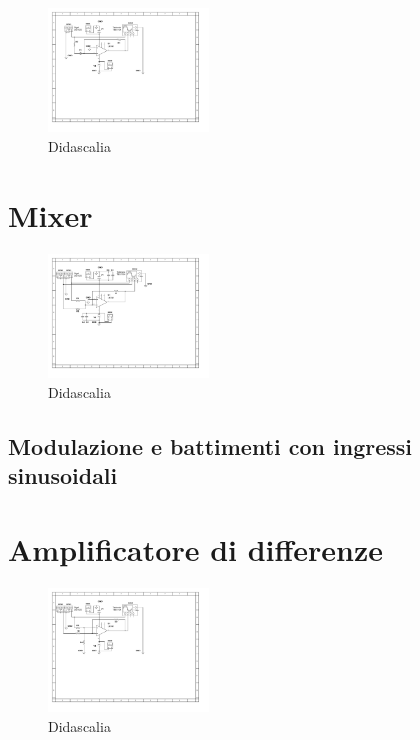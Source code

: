 \documentclass[journal]{IEEEtran}
\begin{document}
\begin{figure}[H]%
\begin {center}
\includegraphics[width=0.38\textwidth]{sch-simulations/output/OPA-deriv.pdf}
\caption{Didascalia}
\label{fig:oscilloscope}
\end {center}
\end{figure}


\section{Mixer} %

\begin{figure}[H]%
\begin {center}
\includegraphics[width=0.38\textwidth]{sch-simulations/output/OPA-mixer.pdf}
\caption{Didascalia}
\label{fig:oscilloscope}
\end {center}
\end{figure}

\subsection{Modulazione e battimenti con ingressi sinusoidali}


\section{Amplificatore di differenze} %
\begin{figure}[H]%
\begin {center}
\includegraphics[width=0.38\textwidth]{sch-simulations/output/OPA-difference-amp.pdf}
\caption{Didascalia}
\label{fig:oscilloscope}
\end {center}
\end{figure}
\end{document}

